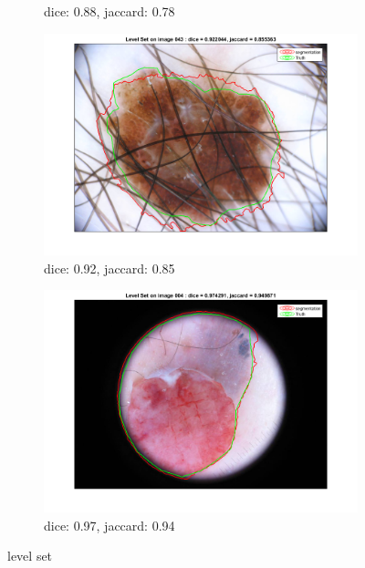 \documentclass[a4paper,10pt]{article}
\begin{document}
\begin{figure}[h]
\begin{subfigure}{0.49\linewidth}
		\caption{dice: 0.88, jaccard: 0.78}
		\label{fig:LS-res-127}
	\end{subfigure}
	\begin{subfigure}{0.49\linewidth}			
		\includegraphics[width=0.99\linewidth]{../results/level_set/im043}
		\caption{dice: 0.92, jaccard: 0.85}
		\label{fig:LS-res-043}
	\end{subfigure}
	\begin{subfigure}{0.49\linewidth}			
		\includegraphics[width=0.99\linewidth]{../results/level_set/im004}
		\caption{dice: 0.97, jaccard: 0.94}
		\label{fig:LS-res-004}
	\end{subfigure}
	\caption{level set}
	\label{fig:level-set-results}
\end{figure}
\end{document}
